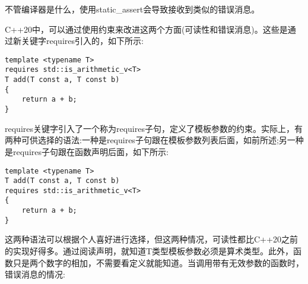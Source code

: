 不管编译器是什么，使用static\_assert会导致接收到类似的错误消息。

C++20中，可以通过使用约束来改进这两个方面(可读性和错误消息)。这些是通过新关键字requires引入的，如下所示:

\begin{lstlisting}[style=styleCXX]
template <typename T>
requires std::is_arithmetic_v<T>
T add(T const a, T const b)
{
	return a + b;
}
\end{lstlisting}

requires关键字引入了一个称为requires子句，定义了模板参数的约束。实际上，有两种可供选择的语法:一种是requires子句跟在模板参数列表后面，如前所述;另一种是requires子句跟在函数声明后面，如下所示:

\begin{lstlisting}[style=styleCXX]
template <typename T>
T add(T const a, T const b)
requires std::is_arithmetic_v<T>
{
	return a + b;
}
\end{lstlisting}

这两种语法可以根据个人喜好进行选择，但这两种情况，可读性都比C++20之前的实现好得多。通过阅读声明，就知道T类型模板参数必须是算术类型。此外，函数只是两个数字的相加，不需要看定义就能知道。当调用带有无效参数的函数时，错误消息的情况:

